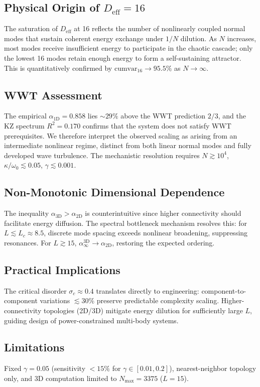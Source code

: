 \documentclass[aps,pre,12pt]{revtex4-2}
\begin{document}
\subsection{Physical Origin of $D_{\text{eff}} = 16$}
The saturation of $D_{\text{eff}}$ at 16 reflects the number of nonlinearly coupled normal modes that sustain coherent energy exchange under $1/N$ dilution. As $N$ increases, most modes receive insufficient energy to participate in the chaotic cascade; only the lowest 16 modes retain enough energy to form a self-sustaining attractor. This is quantitatively confirmed by $\text{cumvar}_{16} \to 95.5\%$ as $N \to \infty$.

\subsection{WWT Assessment}
The empirical $\alpha_{1\text{D}} = 0.858$ lies $\sim 29\%$ above the WWT prediction $2/3$, and the KZ spectrum $R^2 = 0.170$ confirms that the system does not satisfy WWT prerequisites. We therefore interpret the observed scaling as arising from an intermediate nonlinear regime, distinct from both linear normal modes and fully developed wave turbulence. The mechanistic resolution requires $N \gtrsim 10^4$, $\kappa/\omega_0 \lesssim 0.05$, $\gamma \lesssim 0.001$.

\subsection{Non-Monotonic Dimensional Dependence}
The inequality $\alpha_{3\text{D}} > \alpha_{2\text{D}}$ is counterintuitive since higher connectivity should facilitate energy diffusion. The spectral bottleneck mechanism resolves this: for $L \lesssim L_c \approx 8.5$, discrete mode spacing exceeds nonlinear broadening, suppressing resonances. For $L \gtrsim 15$, $\alpha_\infty^{\text{3D}} \to \alpha_{\text{2D}}$, restoring the expected ordering.

\subsection{Practical Implications}
The critical disorder $\sigma_c \approx 0.4$ translates directly to engineering: component-to-component variations $\lesssim 30\%$ preserve predictable complexity scaling. Higher-connectivity topologies (2D/3D) mitigate energy dilution for sufficiently large $L$, guiding design of power-constrained multi-body systems.

\subsection{Limitations}
Fixed $\gamma = 0.05$ (sensitivity $< 15\%$ for $\gamma \in [0.01, 0.2]$), nearest-neighbor topology only, and 3D computation limited to $N_{\max} = 3375$ ($L = 15$).
\end{document}
